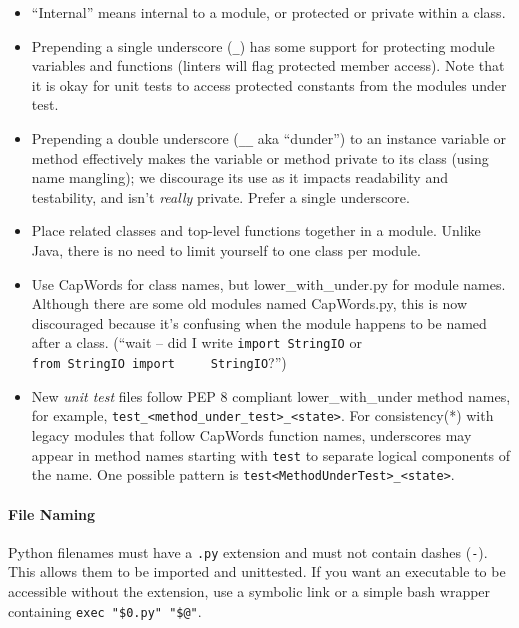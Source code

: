 \documentclass[
]{article}
\begin{document}
\begin{itemize}
\item
  ``Internal'' means internal to a module, or protected or private
  within a class.
\item
  Prepending a single underscore (\texttt{\_}) has some support for
  protecting module variables and functions (linters will flag protected
  member access). Note that it is okay for unit tests to access
  protected constants from the modules under test.
\item
  Prepending a double underscore (\texttt{\_\_} aka ``dunder'') to an
  instance variable or method effectively makes the variable or method
  private to its class (using name mangling); we discourage its use as
  it impacts readability and testability, and isn't \emph{really}
  private. Prefer a single underscore.
\item
  Place related classes and top-level functions together in a module.
  Unlike Java, there is no need to limit yourself to one class per
  module.
\item
  Use CapWords for class names, but lower\_with\_under.py for module
  names. Although there are some old modules named CapWords.py, this is
  now discouraged because it's confusing when the module happens to be
  named after a class. (``wait -- did I write \texttt{import\ StringIO}
  or \texttt{from\ StringIO\ import\ \ \ \ \ StringIO}?'')
\item
  New \emph{unit test} files follow PEP 8 compliant lower\_with\_under
  method names, for example,
  \texttt{test\_\textless{}method\_under\_test\textgreater{}\_\textless{}state\textgreater{}}.
  For consistency(*) with legacy modules that follow CapWords function
  names, underscores may appear in method names starting with
  \texttt{test} to separate logical components of the name. One possible
  pattern is
  \texttt{test\textless{}MethodUnderTest\textgreater{}\_\textless{}state\textgreater{}}.
\end{itemize}

\paragraph{File Naming}

Python filenames must have a \texttt{.py} extension and must not contain
dashes (\texttt{-}). This allows them to be imported and unittested. If
you want an executable to be accessible without the extension, use a
symbolic link or a simple bash wrapper containing
\texttt{exec\ "\$0.py"\ "\$@"}.
\end{document}
